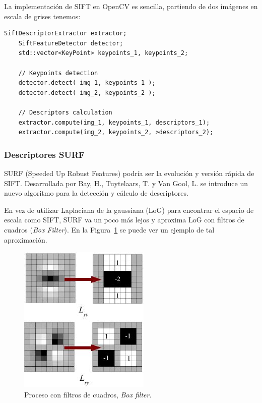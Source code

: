 La implementación de SIFT en OpenCV es sencilla, partiendo de dos imágenes en escala de grises tenemos:

\begin{lstlisting}[style=CStyle]
	SiftDescriptorExtractor extractor;
 	SiftFeatureDetector detector;
 	std::vector<KeyPoint> keypoints_1, keypoints_2;

	// Keypoints detection
 	detector.detect( img_1, keypoints_1 );
 	detector.detect( img_2, keypoints_2 );
  	
 	// Descriptors calculation
 	extractor.compute(img_1, keypoints_1, descriptors_1);
 	extractor.compute(img_2, keypoints_2, >descriptors_2);
\end{lstlisting}

\subsubsection{Descriptores SURF}

SURF (Speeded Up Robust Features) podría ser la evolución y versión rápida de SIFT. Desarrollada por Bay, H., Tuytelaars, T. y Van Gool, L. \parencite{Reference12} se introduce un nuevo algoritmo para la detección y cálculo de descriptores.

En vez de utilizar Laplaciana de la gaussiana (LoG) para encontrar el espacio de escala como SIFT, SURF va un poco más lejos y aproxima LoG con filtros de cuadros (\textit{Box Filter}). En la Figura~\ref{fig:surf1} se puede ver un ejemplo de tal aproximación.

\begin{figure}[ht]
\centering
\includegraphics[scale=0.6]{Figures/surf-1.jpg}
\decoRule
\caption[Ejemplo de \textit{Box filter} en SURF]{Proceso con filtros de cuadros, \textit{Box filter}.}
\label{fig:surf1}
\end{figure}

